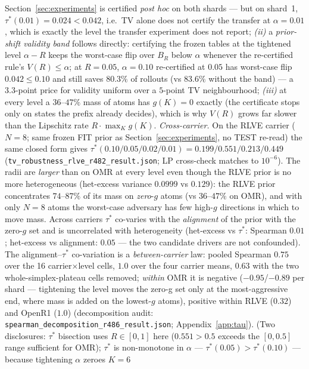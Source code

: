 \documentclass{article}
\theoremstyle{definition}
\theoremstyle{remark}
\begin{document}
Section~\ref{sec:experiments} is certified \emph{post hoc} on both shards
--- but on shard~1, $\tau^*(0.01)=0.024<0.042$, i.e.\ TV alone does not
certify the transfer at $\alpha=0.01$, which is exactly the level the
transfer experiment does not report; \emph{(ii)} a \emph{prior-shift validity
band} follows directly: certifying the frozen tables at the tightened level
$\alpha-R$ keeps the worst-case flip over $B_R$ below $\alpha$ whenever the
re-certified rule's $V(R)\le\alpha$; at $R=0.05$, $\alpha=0.10$ re-certified
at $0.05$ has worst-case flip $0.042\le0.10$ and still saves $80.3\%$ of
rollouts (vs $83.6\%$ without the band) --- a $3.3$-point price for validity
uniform over a $5$-point TV neighbourhood; \emph{(iii)} at every level a $36$--$47\%$ mass of atoms has
$g(K)=0$ exactly (the certificate stops only on states the prefix already
decides), which is why $V(R)$ grows far slower than the Lipschitz rate
$R\cdot\max_K g(K)$.
\emph{Cross-carrier.} On the RLVE carrier ($N{=}8$; same frozen FIT prior as
Section~\ref{sec:experiments}, no TEST re-read) the same closed form gives
$\tau^*(0.10/0.05/0.02/0.01)=0.199/0.551/0.213/0.449$
(\texttt{tv\_robustness\_rlve\_r482\_result.json}; LP cross-check matches to
$10^{-6}$). The radii are \emph{larger} than on OMR at every level even
though the RLVE prior is no more heterogeneous (het-excess variance
$0.0999$ vs $0.129$): the RLVE prior concentrates $74$--$87\%$ of its mass
on \emph{zero}-$g$ atoms (vs $36$--$47\%$ on OMR), and with only $N{=}8$
atoms the worst-case adversary has few high-$g$ directions in which to
move mass. Across carriers $\tau^*$ co-varies with the \emph{alignment} of
the prior with the zero-$g$ set and is uncorrelated with heterogeneity
(het-excess vs $\tau^*$: Spearman $0.01$; het-excess vs alignment: $0.05$
--- the two candidate drivers are not confounded). The
alignment--$\tau^*$ co-variation is a \emph{between-carrier} law: pooled
Spearman $0.75$ over the 16 carrier$\times$level cells, $1.0$ over the
four carrier means, $0.63$ with the two whole-simplex-plateau cells
removed; \emph{within} OMR it is negative ($-0.95$/$-0.89$ per shard ---
tightening the level moves the zero-g set only at the most-aggressive
end, where mass is added on the lowest-$g$ atoms), positive within RLVE
($0.32$) and OpenR1 ($1.0$) (decomposition audit:
\texttt{spearman\_decomposition\_r486\_result.json};
Appendix~\ref{app:tau}). (Two disclosures: $\tau^*$
bisection uses $R\in[0,1]$ here ($0.551>0.5$ exceeds the $[0,0.5]$ range
sufficient for OMR); $\tau^*$ is non-monotone in $\alpha$ ---
$\tau^*(0.05)>\tau^*(0.10)$ --- because tightening $\alpha$ zeroes $K{=}6$
\end{document}
